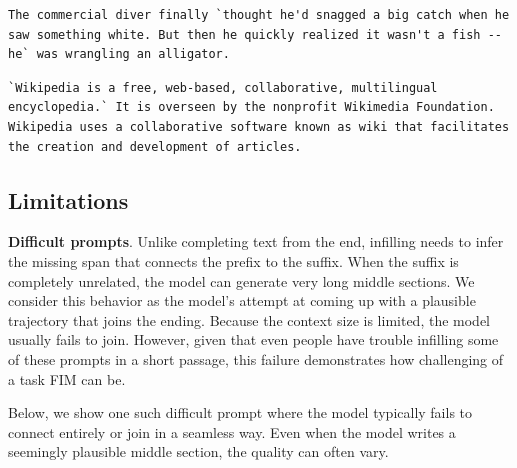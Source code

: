 \documentclass[postscript]{article}
\begin{document}
\vspace{-18pt}
\begin{center}
\begin{minipage}{5in}
\begin{lstlisting}[style=text]
The commercial diver finally `thought he'd snagged a big catch when he saw something white. But then he quickly realized it wasn't a fish -- he` was wrangling an alligator.
\end{lstlisting}
\end{minipage}
\end{center}

\vspace{-18pt}
\begin{center}
\begin{minipage}{5in}
\begin{lstlisting}[style=text]
`Wikipedia is a free, web-based, collaborative, multilingual encyclopedia.` It is overseen by the nonprofit Wikimedia Foundation. Wikipedia uses a collaborative software known as wiki that facilitates the creation and development of articles.
\end{lstlisting}
\end{minipage}
\end{center}
\vspace{-3pt}

\subsection{Limitations}
\label{sec:qual:bad}

\textbf{Difficult prompts}. Unlike completing text from the end, infilling needs to infer the missing span that connects the prefix to the suffix. When the suffix is completely unrelated, the model can generate very long middle sections. We consider this behavior as the model's attempt at coming up with a plausible trajectory that joins the ending. Because the context size is limited, the model usually fails to join. However, given that even people have trouble infilling some of these prompts in a short passage, this failure demonstrates how challenging of a task FIM can be.

Below, we show one such difficult prompt where the model typically fails to connect entirely or join in a seamless way. Even when the model writes a seemingly plausible middle section, the quality can often vary.
\end{document}
